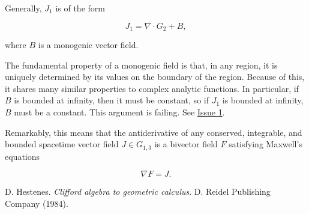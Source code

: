 \documentclass{article}
\begin{document}
  Generally, $J_1$ is of the form

  \begin{equation}
    J_1 = \nabla \cdot G_2 + B,
  \end{equation}

  where $B$ is a monogenic vector field. 

  The fundamental property of a monogenic field is that, in any region, it is uniquely determined by its values on the boundary of the region. Because of this, it shares many similar properties to complex analytic functions. In particular, if $B$ is bounded at infinity, then it must be constant, so if $J_1$ is bounded at infinity, $B$ must be a constant. This argument is failing. See \href{https://github.com/lukeburns/antiderivatives/issues/1}{Issue 1}.

  Remarkably, this means that the antiderivative of any conserved, integrable, and bounded spacetime vector field $J \in G_{1,3}$ is a bivector field $F$ satisfying Maxwell's equations

  \begin{equation}
    \nabla F = J.\label{eq:maxwell}
  \end{equation}

  \begin{thebibliography}{9} 

      D. Hestenes.
      \emph{Clifford algebra to geometric calculus}.
      D. Reidel Publishing Company (1984).

  \end{thebibliography}
\end{document}
